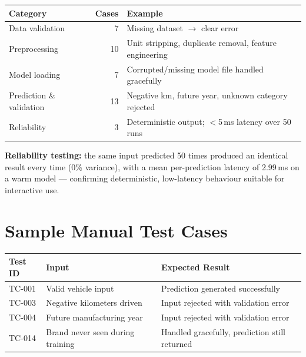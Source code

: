 \documentclass[12pt,a4paper]{report}
\let\oldtable\table
\let\endoldtable\endtable
\renewenvironment{table}[1][H]{\oldtable[#1]\singlespacing}{\endoldtable}
\begin{document}
\begin{table}[H]
\centering
\small
\begin{tabular}{|l|r|p{7.2cm}|}
\hline
\textbf{Category} & \textbf{Cases} & \textbf{Example} \\
\hline
Data validation & 7 & Missing dataset $\rightarrow$ clear error \\
\hline
Preprocessing   & 10 & Unit stripping, duplicate removal, feature engineering \\
\hline
Model loading   & 7 & Corrupted/missing model file handled gracefully \\
\hline
Prediction \& validation & 13 & Negative km, future year, unknown category rejected \\
\hline
Reliability     & 3 & Deterministic output; $<$5\,ms latency over 50 runs \\
\hline
\end{tabular}
\caption{Test suite summary (full detail in \texttt{reports/test\_cases.md}).}
\end{table}

\textbf{Reliability testing:} the same input predicted 50 times produced
an identical result every time (0\% variance), with a mean per-prediction
latency of 2.99\,ms on a warm model --- confirming deterministic,
low-latency behaviour suitable for interactive use.

\section*{Sample Manual Test Cases}
\begin{table}[H]
\centering
\small
\begin{tabular}{|p{2.6cm}|p{5.6cm}|p{5.6cm}|}
\hline
\textbf{Test ID} & \textbf{Input} & \textbf{Expected Result} \\
\hline
TC-001 & Valid vehicle input & Prediction generated successfully \\
\hline
TC-003 & Negative kilometers driven & Input rejected with validation error \\
\hline
TC-004 & Future manufacturing year & Input rejected with validation error \\
\hline
TC-014 & Brand never seen during training & Handled gracefully, prediction still returned \\
\hline
\end{tabular}
\caption{Representative manual test cases (full list: \texttt{reports/test\_cases.md}).}
\end{table}
\end{document}
